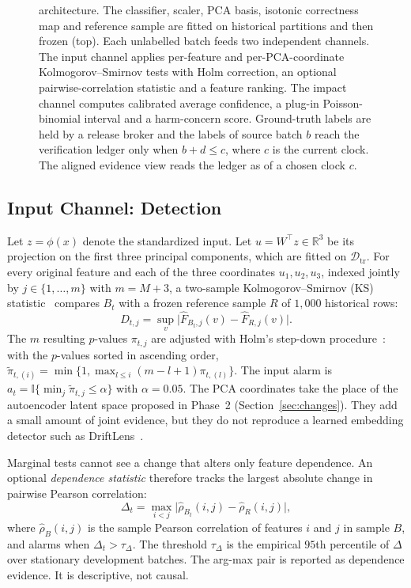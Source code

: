 \begin{figure}[t]
\centering
\resizebox{\textwidth}{!}{}
\caption{\idm{} architecture. The classifier, scaler, PCA basis, isotonic
correctness map and reference sample are fitted on historical partitions and then
frozen (top). Each unlabelled batch feeds two independent channels. The input
channel applies per-feature and per-PCA-coordinate Kolmogorov--Smirnov tests with Holm
correction, an optional pairwise-correlation statistic and a feature ranking. The
impact channel computes calibrated average confidence, a plug-in Poisson-binomial
interval and a harm-concern score. Ground-truth labels are held by a release broker
and the labels of source batch $b$ reach the verification ledger only when
$b+d\le c$, where $c$ is the current clock. The aligned evidence view
reads the ledger as of a chosen clock $c$.}
\label{fig:arch}
\end{figure}

\subsection{Input Channel: Detection}
\label{sec:detection}
Let $z=\phi(x)$ denote the standardized input. Let
$u=W^{\top}z\in\mathbb{R}^{3}$ be its projection on the first three principal
components, which are fitted on $\mathcal{D}_{\mathrm{tr}}$. For every original
feature and each of the three coordinates $u_1,u_2,u_3$, indexed jointly by
$j\in\{1,\dots,m\}$ with $m=M+3$, a two-sample
Kolmogorov--Smirnov (KS) statistic~\cite{massey1951ks} compares $B_t$ with a frozen
reference sample $R$ of $1{,}000$ historical rows:
\begin{equation}
D_{t,j}=\sup_{v}\bigl|\hat{F}_{B_t,j}(v)-\hat{F}_{R,j}(v)\bigr|.
\end{equation}
The $m$ resulting $p$-values $\pi_{t,j}$ are adjusted with Holm's step-down
procedure~\cite{holm1979}: with the $p$-values sorted in ascending order,
$\tilde{\pi}_{t,(i)}=\min\{1,\max_{l\le i}(m-l+1)\pi_{t,(l)}\}$.
The input alarm is $a_t=\mathbb{I}\{\min_j\tilde{\pi}_{t,j}\le\alpha\}$ with
$\alpha=0.05$. The PCA coordinates take the place of the autoencoder latent space
proposed in Phase~2 (Section~\ref{sec:changes}). They add a small amount of joint
evidence, but they do not reproduce a learned embedding detector such as
DriftLens~\cite{greco2025driftlens}.

Marginal tests cannot see a change that alters only feature dependence. An
optional \emph{dependence statistic} therefore tracks the largest absolute change in
pairwise Pearson correlation:
\begin{equation}
\Delta_t=\max_{i<j}\bigl|\hat{\rho}_{B_t}(i,j)-\hat{\rho}_{R}(i,j)\bigr|,
\label{eq:dep}
\end{equation}
where $\hat{\rho}_{B}(i,j)$ is the sample Pearson correlation of features $i$ and $j$
in sample $B$, and alarms when $\Delta_t>\tau_\Delta$. The threshold $\tau_\Delta$ is the empirical
$95$th percentile of $\Delta$ over stationary development batches. The arg-max pair
is reported as dependence evidence. It is descriptive, not causal.

